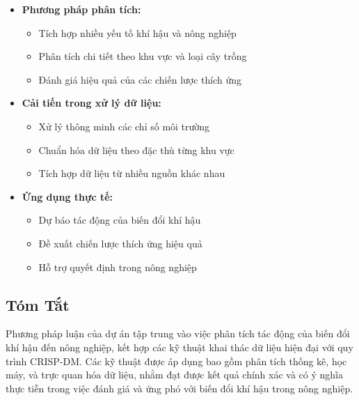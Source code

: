 \begin{itemize}
    \item \textbf{Phương pháp phân tích:}
    \begin{itemize}
        \item Tích hợp nhiều yếu tố khí hậu và nông nghiệp
        \item Phân tích chi tiết theo khu vực và loại cây trồng
        \item Đánh giá hiệu quả của các chiến lược thích ứng
    \end{itemize}
    
    \item \textbf{Cải tiến trong xử lý dữ liệu:}
    \begin{itemize}
        \item Xử lý thông minh các chỉ số môi trường
        \item Chuẩn hóa dữ liệu theo đặc thù từng khu vực
        \item Tích hợp dữ liệu từ nhiều nguồn khác nhau
    \end{itemize}
    
    \item \textbf{Ứng dụng thực tế:}
    \begin{itemize}
        \item Dự báo tác động của biến đổi khí hậu
        \item Đề xuất chiến lược thích ứng hiệu quả
        \item Hỗ trợ quyết định trong nông nghiệp
    \end{itemize}
\end{itemize}

\subsection*{Tóm Tắt}
Phương pháp luận của dự án tập trung vào việc phân tích tác động của biến đổi khí hậu đến nông nghiệp, kết hợp các kỹ thuật khai thác dữ liệu hiện đại với quy trình CRISP-DM. Các kỹ thuật được áp dụng bao gồm phân tích thống kê, học máy, và trực quan hóa dữ liệu, nhằm đạt được kết quả chính xác và có ý nghĩa thực tiễn trong việc đánh giá và ứng phó với biến đổi khí hậu trong nông nghiệp. 
